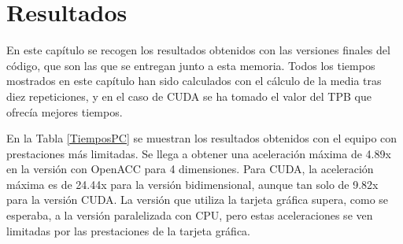 \chapter{Resultados}
En este capítulo se recogen los resultados obtenidos con las versiones finales del código, que son las que se entregan junto a esta memoria. Todos los tiempos mostrados en este capítulo han sido calculados con el cálculo de la media tras diez repeticiones, y en el caso de CUDA se ha tomado el valor del TPB que ofrecía mejores tiempos.

En la Tabla \ref{TiemposPC} se muestran los resultados obtenidos con el equipo con prestaciones más limitadas. Se llega a obtener una aceleración máxima de 4.89x en la versión con OpenACC para 4 dimensiones. Para CUDA, la aceleración máxima es de 24.44x para la versión bidimensional, aunque tan solo de 9.82x para la versión CUDA. La versión que utiliza la tarjeta gráfica supera, como se esperaba, a la versión paralelizada con CPU, pero estas aceleraciones se ven limitadas por las prestaciones de la tarjeta gráfica.

